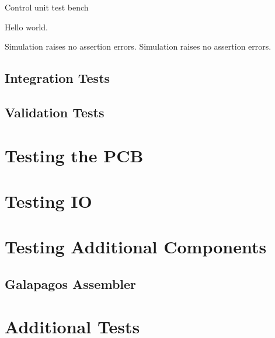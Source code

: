 \test
{Control unit test bench}
{
\item{Hello world.}
}
{Simulation raises no assertion errors.}
{Simulation raises no assertion errors.}

\subsection{Integration Tests}

\subsection{Validation Tests}

\section{Testing the PCB}

\section{Testing IO}

\section{Testing Additional Components}

\subsection{Galapagos Assembler}


\section{Additional Tests}

